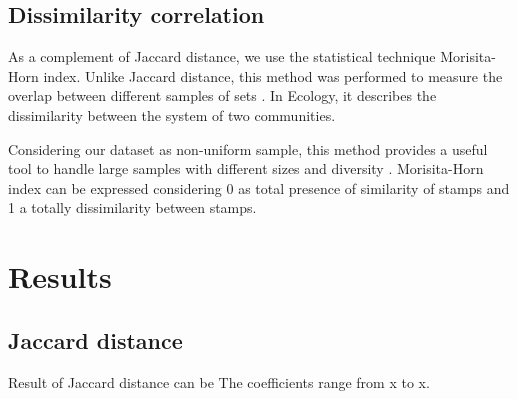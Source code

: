 \documentclass[review]{elsarticle}
\begin{document}




\subsection{Dissimilarity correlation}

As a complement of Jaccard distance, we use the statistical technique Morisita-Horn index. Unlike Jaccard distance, this method was performed to measure the overlap between different samples of sets \citep{horn_measurement_1966}. In Ecology, it describes the dissimilarity between the system of two communities. 

Considering our dataset as non-uniform sample, this method provides a useful tool to handle large samples with different sizes and diversity \citep{wolda_similarity_1981}. Morisita-Horn index can be expressed considering 0 as total presence of similarity of stamps and 1 a totally dissimilarity between stamps. 



\section{Results}

\subsection{Jaccard distance}

Result of Jaccard distance can be The coefficients range from x to x.
\end{document}
